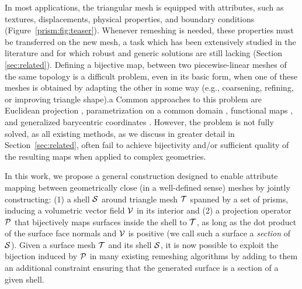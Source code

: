 In most applications, the triangular mesh is equipped with attributes, such as textures, displacements, physical properties, and boundary conditions (Figure~\ref{prism:fig:teaser}). Whenever remeshing is needed, these properties must be transferred on the new mesh, a task which has been extensively studied in the literature and for which robust and generic solutions are still lacking (Section \ref{sec:related}). 
Defining a  bijective map,  between two   piecewise-linear meshes of the same topology is a difficult problem, even in its basic form, when one of these meshes is obtained by adapting the other in some way (e.g., coarsening, refining, or improving triangle shape).a
Common approaches to this problem are Euclidean projection
\cite{jiao2004overlaying}, parametrization on a common domain \cite{praun2001consistent,kraevoy2004cross,lee1998maps}, functional maps \cite{Ovsjanikov:2012}, and generalized barycentric coordinates \cite{Hormann:2017:GBC}.  However, the problem is not fully solved, as all existing methods, as we discuss in greater detail in Section~\ref{sec:related},
 often fail to achieve bijectivity and/or sufficient quality of the resulting maps when applied to complex geometries. %

In this work, we propose a general construction designed to enable attribute mapping between geometrically close (in a well-defined sense) meshes by jointly constructing: (1) a shell $\S$ around triangle mesh $\T$ spanned by a set of prisms, inducing a volumetric vector field $\V$ in its interior and (2) a projection operator $\P$ that bijectively maps surfaces inside the shell to $\T$, as long as the dot product of the surface face normals and $\V$ is positive
(we call such a surface a \emph{section} of $\S$).
Given a surface mesh $\T$ and its shell $\S$, it is now possible to exploit the bijection induced by $\P$ in many existing remeshing algorithms by adding to them an additional constraint ensuring that the generated surface is a section of a given shell.

